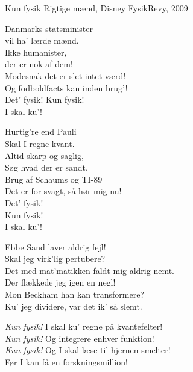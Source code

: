 \begin{song}{Kun fysik}
  {} %
  {Rigtige mænd, Disney} %
  {} %
  {FysikRevy, 2009} %
  {\NotCCLIed} %

  \begin{SBVerse}
    Danmarks statsminister\\
    vil ha' lærde mænd.\\
    Ikke humanister,\\
    der er nok af dem!\\
    Modesnak det er slet intet værd!\\
    Og fodboldfacts kan inden brug'!\\
    Det' fysik! Kun fysik!\\
    I skal ku'!
  \end{SBVerse}

  \begin{SBVerse}
    Hurtig're end Pauli\\
    Skal I regne kvant.\\
    Altid skarp og saglig,\\
    Søg hvad der er sandt.\\
    Brug af Schaums og TI-89\\
    Det er for svagt, så hør mig nu!\\
    Det' fysik!\\
    Kun fysik!\\
    I skal ku'!
  \end{SBVerse}

  \begin{SBSection*}
    Ebbe Sand laver aldrig fejl!\\
    Skal jeg virk'lig pertubere?\\
    Det med mat'matikken faldt mig aldrig nemt.\\
    Der flækkede jeg igen en negl!\\
    Mon Beckham han kan transformere?\\
    Ku' jeg dividere, var det ik' så slemt.
  \end{SBSection*}

  \begin{SBChorus}
    \emph{Kun fysik!} I skal ku' regne på kvantefelter!\\
    \emph{Kun fysik!} Og integrere enhver funktion!\\
    \emph{Kun fysik!} Og I skal læse til hjernen smelter!\\
    Før I kan få en forskningsmillion!
  \end{SBChorus}


\end{song}
